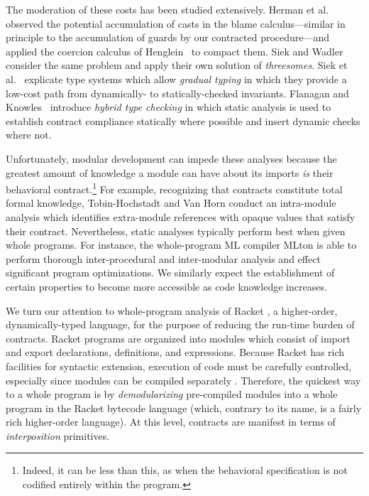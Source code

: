 \documentclass{sigplanconf}
\begin{document}
The moderation of these costs has been studied extensively.
Herman et al.~\cite{herman2010space} observed the potential accumulation of casts in the blame calculus---similar in principle to the accumulation of guards by our contracted  procedure---and applied the coercion calculus of Henglein~\cite{henglein1994dynamic} to compact them.
Siek and Wadler~\cite{siek2010threesomes} consider the same problem and apply their own solution of \emph{threesomes}.
Siek et al.~\cite{siek2006gradual} explicate type systems which allow \emph{gradual typing} in which they provide a low-cost path from dynamically- to statically-checked invariants.
Flanagan and Knowles~\cite{flanagan2006hybrid} introduce \emph{hybrid type checking} in which static analysis is used to establish contract compliance statically where possible and insert dynamic checks where not.

Unfortunately, modular development can impede these analyses because the greatest amount of knowledge a module can have about its imports \emph{is} their behavioral contract.\footnote{Indeed, it can be less than this, as when the behavioral specification is not codified entirely within the program.}
For example, recognizing that contracts constitute total formal knowledge, Tobin-Hochstadt and Van Horn \cite{tobin2012higher} conduct an intra-module analysis which identifies extra-module references with opaque values that satisfy their contract.
Nevertheless, static analyses typically perform best when given whole programs.
For instance, the whole-program ML compiler MLton \cite{weeks2006whole} is able to perform thorough inter-procedural and inter-modular analysis and effect significant program optimizations.
We similarly expect the establishment of certain properties to become more accessible as code knowledge increases.

We turn our attention to whole-program analysis of Racket \cite{plt-tr1}, a higher-order, dynamically-typed language, for the purpose of reducing the run-time burden of contracts.
Racket programs are organized into modules which consist of import and export declarations, definitions, and expressions.
Because Racket has rich facilities for syntactic extension, execution of code must be carefully controlled, especially since modules can be compiled separately \cite{flatt2002composable}.
Therefore, the quickest way to a whole program is by \emph{demodularizing} pre-compiled modules into a whole program in the Racket bytecode language (which, contrary to its name, is a fairly rich higher-order language).
At this level, contracts are manifest in terms of \emph{interposition} primitives.
\end{document}
